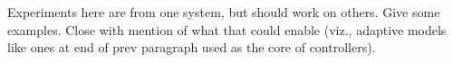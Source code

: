 Experiments here are from one system, but should work on others.  Give
some examples.  Close with mention of what that could enable (viz.,
adaptive models like ones at end of prev paragraph used as the core of
controllers).

